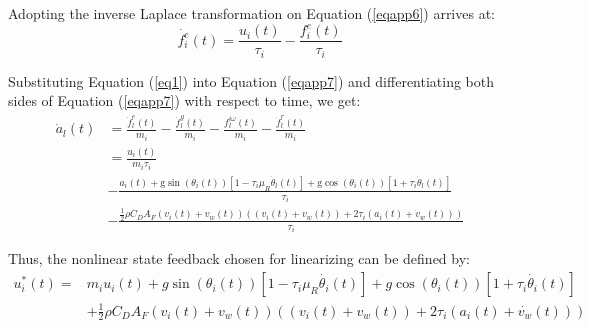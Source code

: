 \documentclass[a4paper]{cas-sc}
\begin{document}
Adopting the inverse Laplace transformation on Equation (\ref{eqapp6}) arrives at:
\begin{equation}
  \dot{f_i^e}\left(t\right)=\frac{u_i(t)}{\tau_i}-\frac{f_i^e\left(t\right)}{\tau_i}
  \label{eqapp7}
\end{equation}

Substituting Equation (\ref{eq1}) into Equation (\ref{eqapp7}) and differentiating both sides of Equation (\ref{eqapp7}) with respect to time, we get:
\begin{equation}
  \begin{aligned}
    \dot{a}_{l}(t) & =\frac{\dot{f}_{l}^{e}(t)}{m_{i}}-\frac{\dot{f}_{l}^{g}(t)}{m_{i}}-\frac{f_{l}^{i \omega}(t)}{m_{i}}-\frac{\dot{f}_{l}^{r}(t)}{m_{i}}                                                                                         \\
                   & =               \frac{u_{i}(t)}{m_{i} \tau_{i}}                                                                                                                                                                               \\
                   & -               \frac{a_{i}(t)+\mathrm{g} \sin \left(\theta_{i}(t)\right)\left[1-\tau_{i} \mu_{R} \dot{\theta}_{l}(t)\right]+\mathrm{g} \cos \left(\theta_{i}(t)\right)\left[1+\tau_{i} \dot{\theta}_{l}(t)\right]}{\tau_{i}} \\
                   & -               \frac{\frac{1}{2} \rho C_{D} A_{F}\left(v_{i}(t)+v_{w}(t)\right)\left(\left(v_{i}(t)+v_{w}(t)\right)+2 \tau_{i}\left(a_{i}(t)+\dot{v}_{w}(t)\right)\right)}{\tau_{i}}
  \end{aligned}
  \label{eqapp8}
\end{equation}

Thus, the nonlinear state feedback chosen for linearizing can be defined by:
\begin{equation}
  \begin{aligned}
    u_i^\ast\left(t\right)= & m_iu_i\left(t\right)+g\sin{\left(\theta_i\left(t\right)\right)}\left[1-\tau_i\mu_R\dot{\theta_i}\left(t\right)\right]+g\cos{\left(\theta_i\left(t\right)\right)}\left[1+\tau_i\dot{\theta_i}\left(t\right)\right]\ \\
                            & +\frac{1}{2}\rho C_DA_F\left(v_i\left(t\right)+v_w\left(t\right)\right)\left(\left(v_i\left(t\right)+v_w\left(t\right)\right)+2\tau_i(a_i\left(t\right)+\dot{v_w}\left(t\right))\right)
  \end{aligned}
  \label{eqapp9}
\end{equation}
\end{document}

